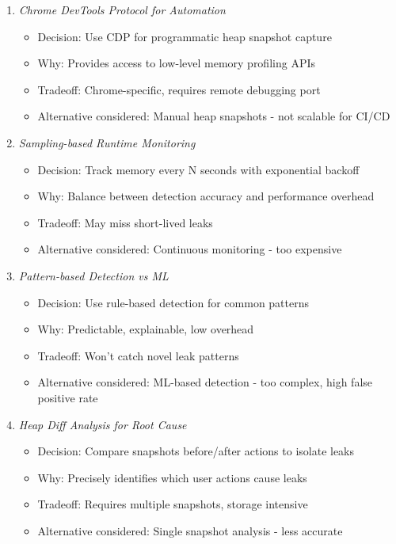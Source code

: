 \documentclass[11pt]{article}
\begin{document}
\begin{enumerate}
\item \emph{Chrome DevTools Protocol for Automation}

\begin{itemize}
\item Decision: Use CDP for programmatic heap snapshot capture
\item Why: Provides access to low-level memory profiling APIs
\item Tradeoff: Chrome-specific, requires remote debugging port
\item Alternative considered: Manual heap snapshots - not scalable for CI/CD
\end{itemize}

\item \emph{Sampling-based Runtime Monitoring}

\begin{itemize}
\item Decision: Track memory every N seconds with exponential backoff
\item Why: Balance between detection accuracy and performance overhead
\item Tradeoff: May miss short-lived leaks
\item Alternative considered: Continuous monitoring - too expensive
\end{itemize}

\item \emph{Pattern-based Detection vs ML}

\begin{itemize}
\item Decision: Use rule-based detection for common patterns
\item Why: Predictable, explainable, low overhead
\item Tradeoff: Won't catch novel leak patterns
\item Alternative considered: ML-based detection - too complex, high false positive rate
\end{itemize}

\item \emph{Heap Diff Analysis for Root Cause}

\begin{itemize}
\item Decision: Compare snapshots before/after actions to isolate leaks
\item Why: Precisely identifies which user actions cause leaks
\item Tradeoff: Requires multiple snapshots, storage intensive
\item Alternative considered: Single snapshot analysis - less accurate
\end{itemize}
\end{enumerate}
\end{document}
